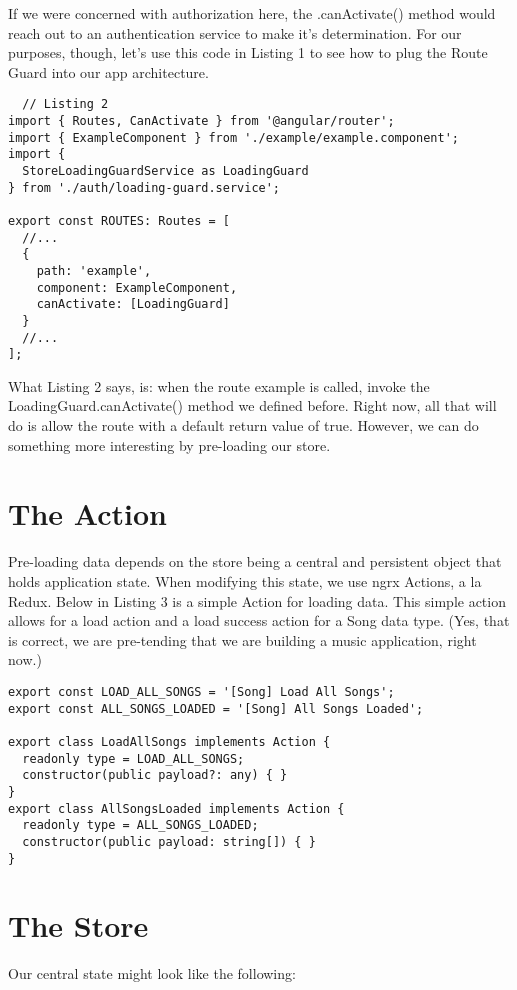If we were concerned with authorization here, the .canActivate() method would
reach out to an authentication service to make it's determination. For our
purposes, though, let's use this code in Listing 1 to see how to plug the Route
Guard into our app architecture.

\begin{lstlisting}
  // Listing 2
import { Routes, CanActivate } from '@angular/router';
import { ExampleComponent } from './example/example.component';
import {
  StoreLoadingGuardService as LoadingGuard
} from './auth/loading-guard.service';

export const ROUTES: Routes = [
  //...
  {
    path: 'example',
    component: ExampleComponent,
    canActivate: [LoadingGuard]
  }
  //...
];

\end{lstlisting}

What Listing 2 says, is: when the route example is called, invoke the
LoadingGuard.canActivate() method we defined before. Right now, all that will
do is allow the route with a default return value of true. However, we can do
something more interesting by pre-loading our store.

\section{ The Action }
Pre-loading data depends on the store being a central and persistent object that
holds application state. When modifying this state, we use ngrx Actions, a la
Redux.  Below in Listing 3 is a simple Action for loading data. This simple
action allows for a load action and a load success action for a Song data type.
(Yes, that is correct, we are pre-tending that we are building a music
application, right now.)

\begin{lstlisting}
export const LOAD_ALL_SONGS = '[Song] Load All Songs';
export const ALL_SONGS_LOADED = '[Song] All Songs Loaded';

export class LoadAllSongs implements Action {
  readonly type = LOAD_ALL_SONGS;
  constructor(public payload?: any) { }
}
export class AllSongsLoaded implements Action {
  readonly type = ALL_SONGS_LOADED;
  constructor(public payload: string[]) { }
}
\end{lstlisting}

\section{The Store}
Our central state might look like the following:

